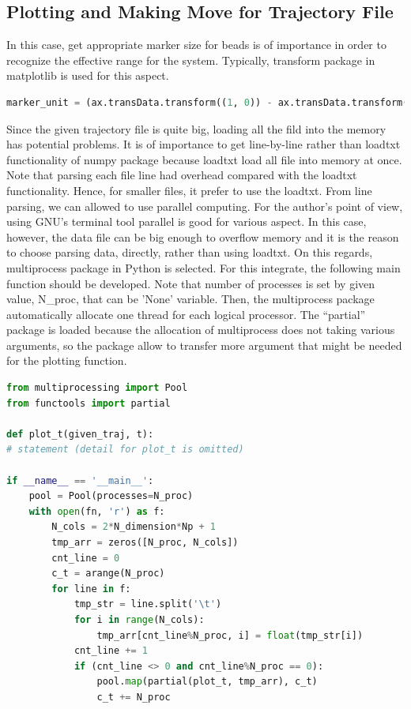 \documentclass[10pt, a4paper]{article}
\begin{document}
\begin{appendices}
\subsection{Plotting and Making Move for Trajectory File}
In this case, get appropriate marker size for beads is of importance in order to recognize the effective range for the system. Typically, transform package in matplotlib is used for this aspect.
\begin{lstlisting}[language=Python,frame=single,numbers=none]
  marker_unit = (ax.transData.transform((1, 0)) - ax.transData.transform((0, 0)))[0]
\end{lstlisting}

Since the given trajectory file is quite big, loading all the fild into the memory has potential problems. It is of importance to get line-by-line rather than loadtxt functionality of numpy package because loadtxt load all file into memory at once. Note that parsing each file line had overhead compared with the loadtxt functionality. Hence, for smaller files, it prefer to use the loadtxt. From line parsing, we can allowed to use parallel computing. For the author's point of view, using GNU's terminal tool parallel is good for various aspect. In this case, however, the data file can be big enough to overflow memory and it is the reason to choose parsing data, directly, rather than using loadtxt. On this regards, multiprocess package in Python is selected. For this integrate, the following main function should be developed. Note that number of processes is set by given value, N{\_}proc, that can be 'None' variable. Then, the multiprocess package automatically allocate one thread for each logical processor. The ``partial'' package is loaded because the allocation of multiprocess does not taking various arguments, so the package allow to transfer more argument that might be needed for the plotting function.

\begin{lstlisting}[language=Python,frame=single]
from multiprocessing import Pool
from functools import partial

def plot_t(given_traj, t):
# statement (detail for plot_t is omitted)

if __name__ == '__main__':
    pool = Pool(processes=N_proc)
    with open(fn, 'r') as f:
        N_cols = 2*N_dimension*Np + 1
        tmp_arr = zeros([N_proc, N_cols])
        cnt_line = 0
        c_t = arange(N_proc)
        for line in f:
            tmp_str = line.split('\t')
            for i in range(N_cols):
                tmp_arr[cnt_line%N_proc, i] = float(tmp_str[i])
            cnt_line += 1
            if (cnt_line <> 0 and cnt_line%N_proc == 0):
                pool.map(partial(plot_t, tmp_arr), c_t)
                c_t += N_proc
\end{lstlisting}


\end{appendices}
\end{document}
